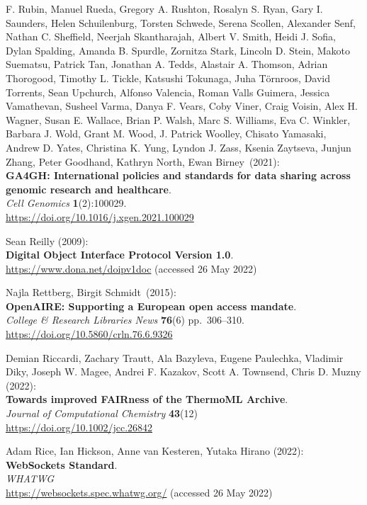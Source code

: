 \begin{thebibliography}{9}
F. Rubin, Manuel Rueda, Gregory A. Rushton, Rosalyn S. Ryan, Gary I.
Saunders, Helen Schuilenburg, Torsten Schwede, Serena Scollen, Alexander
Senf, Nathan C. Sheffield, Neerjah Skantharajah, Albert V. Smith, Heidi
J. Sofia, Dylan Spalding, Amanda B. Spurdle, Zornitza Stark, Lincoln D.
Stein, Makoto Suematsu, Patrick Tan, Jonathan A. Tedds, Alastair A.
Thomson, Adrian Thorogood, Timothy L. Tickle, Katsushi Tokunaga, Juha
Törnroos, David Torrents, Sean Upchurch, Alfonso Valencia, Roman Valls
Guimera, Jessica Vamathevan, Susheel Varma, Danya F. Vears, Coby Viner,
Craig Voisin, Alex H. Wagner, Susan E. Wallace, Brian P. Walsh, Marc S.
Williams, Eva C. Winkler, Barbara J. Wold, Grant M. Wood, J. Patrick
Woolley, Chisato Yamasaki, Andrew D. Yates, Christina K. Yung, Lyndon J.
Zass, Ksenia Zaytseva, Junjun Zhang, Peter Goodhand, Kathryn North, Ewan
Birney~(2021):\\
\textbf{GA4GH: International policies and standards for data sharing
across genomic research and healthcare}.\\
\emph{Cell Genomics} \textbf{1}(2):100029.\\
\url{https://doi.org/10.1016/j.xgen.2021.100029}


Sean Reilly (2009): \\
\textbf{Digital Object Interface Protocol Version 1.0}.\\
\url{https://www.dona.net/doipv1doc} (accessed 26 May 2022)

Najla Rettberg, Birgit Schmidt~(2015):\\
\textbf{OpenAIRE: Supporting a European open access mandate}.\\
\emph{College \& Research Libraries News} \textbf{76}(6) pp.~306--310.\\
\url{https://doi.org/10.5860/crln.76.6.9326}

Demian Riccardi, Zachary Trautt, Ala Bazyleva, Eugene Paulechka, Vladimir Diky, Joseph W. Magee, Andrei F. Kazakov, Scott A. Townsend, Chris D. Muzny (2022):\\
\textbf{Towards improved {FAIRness} of the {ThermoML} Archive}.\\
\emph{Journal of Computational Chemistry} \textbf{43}(12)\\
\url{https://doi.org/10.1002/jcc.26842}


Adam Rice, Ian Hickson, Anne van Kesteren, Yutaka Hirano (2022):\\
\textbf{WebSockets Standard}. \\
\emph{WHATWG}\\
\url{https://websockets.spec.whatwg.org/}
(accessed 26 May 2022)


\end{thebibliography}
